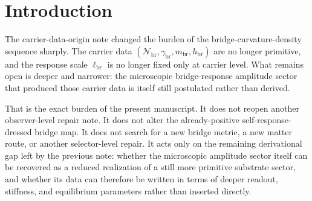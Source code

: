 \documentclass[11pt]{article}
\newcommand{\CurvScale}{\ell_{\mathrm{br}}}
\newcommand{\CurvProfileCan}{F_{\mathrm{br}}^{\mathrm{can}}}
\newcommand{\RespSusEq}{\Sigma_{\mathrm{br}}^{\ast}}
\newcommand{\RespNorm}{\mathcal N_{\mathrm{br}}}
\newcommand{\RespFluxCoeff}{\gamma_{\mathrm{br}}}
\newcommand{\RespGap}{m_{\mathrm{br}}}
\newcommand{\RespBias}{h_{\mathrm{br}}}
\begin{document}
\begin{abstract}
\[
\CurvProfileCan(x)=1+\RespSusEq x^2.
\]
Because the local bridge-curvature family remains profile-blind, substituting \(\CurvProfileCan\) back into that family preserves the same reduced current, Hamiltonian-charge flux, continuity/Gauss-Poisson package, exterior Coulomb tail, surviving dressed bridge map, and matter-free/off-longitudinal/cubic/quartic gain package as before. The claim boundary is strict: the note does not claim that the primitive bridge-order sector is the unique ultraviolet completion of the bridge-curvature response line. Its narrower positive result is that the microscopic bridge-response amplitude sector is no longer primitive either; it is the uniquely selected phase-neutral quadratic reduction of a still deeper \(O(2)\)-symmetric primitive bridge-order sector.
\end{abstract}

\section{Introduction}

The carrier-data-origin note changed the burden of the bridge-curvature-density sequence sharply. The carrier data \((\RespNorm,\RespFluxCoeff,\RespGap,\RespBias)\) are no longer primitive, and the response scale \(\CurvScale\) is no longer fixed only at carrier level. What remains open is deeper and narrower: the microscopic bridge-response amplitude sector that produced those carrier data is itself still postulated rather than derived.

That is the exact burden of the present manuscript. It does not reopen another observer-level repair note. It does not alter the already-positive self-response-dressed bridge map. It does not search for a new bridge metric, a new matter route, or another selector-level repair. It acts only on the remaining derivational gap left by the previous note: whether the microscopic amplitude sector itself can be recovered as a reduced realization of a still more primitive substrate sector, and whether its data can therefore be written in terms of deeper readout, stiffness, and equilibrium parameters rather than inserted directly.
\end{document}
